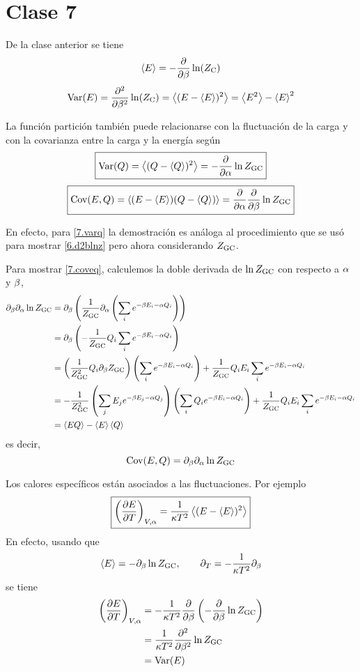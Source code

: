 \section{Clase 7}
De la clase anterior se tiene
\begin{equation}
\ev{E}=-\pdv{\b}\ln (\zc)
\end{equation}
\begin{equation}
\text{Var}(E)=\pdv[2]{\b}\ln(\zc)=\ev{(E-\ev{E})^2}=\ev{E^2}-\ev{E}^2
\end{equation}

La función partición también puede relacionarse con la fluctuación de la carga y con la covarianza entre la carga y la energía según
\begin{equation}\label{7.varq}
  \boxed{\var(Q)=\ev{(Q-\ev{Q})^2}=-\pdv{\a }\ln\zgc}
\end{equation}
\begin{equation}\label{7.coveq}
  \boxed{\text{Cov}(E,Q)=\ev{(E-\ev{E})(Q-\ev{Q})}=\pdv{\a }\pdv{\b }\ln\zgc}
\end{equation}

En efecto, para \eqref{7.varq} la demostración es análoga al procedimiento que se usó para mostrar \eqref{6.d2blnz} pero ahora considerando $Z_{\rm GC}$.

Para mostrar \eqref{7.coveq}, calculemos la doble derivada de $\ln Z_{\rm GC}$ con respecto a $\alpha$ y $\beta$,
\begin{align*}
 	\partial_\b\partial_\a \ln\zgc&=\partial_\b \left(\frac{1}{\zgc}\partial_\a \left(\sumi \eba\right)\right)\\
 	&=\partial_\b\left(-\frac{1}{\zgc}Q_i\sumi \eba\right)\\
 	&=\left(\frac{1}{\zgc^2}Q_i\partial_\b \zgc\right)\left(\sumi \eba\right)+\frac{1}{\zgc}Q_iE_i\sumi \eba\\
 	&=-\frac{1}{\zgc^2}\left(\sumj E_j\ebaj\right)\left(\sumi Q_i\eba\right)+\frac{1}{\zgc}Q_iE_i\sumi \eba\\
 	&=\ev{EQ}-\ev{E}\ev{Q}
\end{align*}
es decir,
\begin{equation}
  \text{Cov}(E,Q)=\partial_\beta\partial_\alpha \ln Z_{\rm GC}
\end{equation}

Los calores específicos están asociados a las fluctuaciones. Por ejemplo
\begin{equation}
  \boxed{\left(\pdv{E}{T}\right)_{V,\a }=\frac{1}{\k T^2}\ev{(E-\ev{E})^2}}
\end{equation}
En efecto, usando que
\begin{equation}
  \ev{E}=-\partial_\b \ln\zgc,\qquad \partial_T=-\frac{1}{\k T^2}\partial_\b 
\end{equation}
se tiene
\begin{align}
  \left(\pdv{E}{T}\right)_{V,\alpha }&=-\frac{1}{\kappa T^2}\pdv{\beta}\left(-\pdv{\beta}\ln Z_{\rm GC}\right)\\
  &=\frac{1}{\kappa T^2}\pdv[2]{\beta}\ln Z_{\rm GC}\\
  &=\text{Var} (E)
\end{align}

